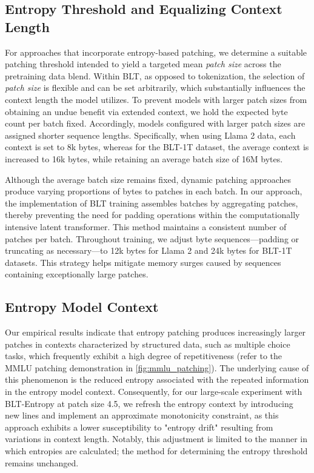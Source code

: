 \subsection{Entropy Threshold and Equalizing Context Length} For approaches that incorporate entropy-based patching, we determine a suitable patching threshold intended to yield a targeted mean \textit{patch size} across the pretraining data blend. Within {\textsc BLT}, as opposed to tokenization, the selection of \textit{patch size} is flexible and can be set arbitrarily, which substantially influences the context length the model utilizes. To prevent models with larger patch sizes from obtaining an undue benefit via extended context, we hold the expected byte count per batch fixed. Accordingly, models configured with larger patch sizes are assigned shorter sequence lengths. Specifically, when using Llama 2 data, each context is set to 8k bytes, whereas for the {\textsc BLT}-1T dataset, the average context is increased to 16k bytes, while retaining an average batch size of 16M bytes.

Although the average batch size remains fixed, dynamic patching approaches produce varying proportions of bytes to patches in each batch. In our approach, the implementation of {\textsc BLT} training assembles batches by aggregating patches, thereby preventing the need for padding operations within the computationally intensive latent transformer. This method maintains a consistent number of patches per batch. Throughout training, we adjust byte sequences—padding or truncating as necessary—to 12k bytes for Llama 2 and 24k bytes for {\textsc BLT}-1T datasets. This strategy helps mitigate memory surges caused by sequences containing exceptionally large patches.

\subsection{Entropy Model Context}
\label{section:entropy-context}
Our empirical results indicate that entropy patching produces increasingly larger patches in contexts characterized by structured data, such as multiple choice tasks, which frequently exhibit a high degree of repetitiveness (refer to the MMLU patching demonstration in \autoref{fig:mmlu_patching}). The underlying cause of this phenomenon is the reduced entropy associated with the repeated information in the entropy model context. Consequently, for our large-scale experiment with {\textsc BLT}-Entropy at patch size 4.5, we refresh the entropy context by introducing new lines and implement an approximate monotonicity constraint, as this approach exhibits a lower susceptibility to "entropy drift" resulting from variations in context length. Notably, this adjustment is limited to the manner in which entropies are calculated; the method for determining the entropy threshold remains unchanged.

